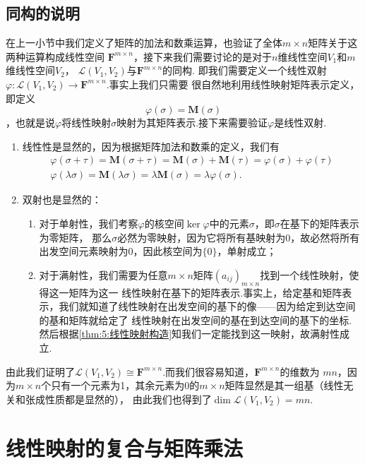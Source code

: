 \subsection{同构的说明}
在上一小节中我们定义了矩阵的加法和数乘运算，也验证了全体$m\times n$矩阵关于这两种运算构成线性空间
$\mathbf{F}^{m\times n}$，接下来我们需要讨论的是对于$n$维线性空间$V_1$和$m$维线性空间$V_2$，
$\mathcal{L}(V_1,V_2)$与$\mathbf{F}^{m\times n}$的同构.
即我们需要定义一个线性双射$\varphi:\mathcal{L}(V_1,V_2)\to\mathbf{F}^{m\times n}$.事实上我们只需要
很自然地利用线性映射矩阵表示定义，即定义
\[\varphi(\sigma)=\mathbf{M}(\sigma)\]
，也就是说$\varphi$将线性映射$\sigma$映射为其矩阵表示.接下来需要验证$\varphi$是线性双射.
\begin{enumerate}
    \item 线性性是显然的，因为根据矩阵加法和数乘的定义，我们有
    \begin{gather*}
        \varphi(\sigma+\tau)=\mathbf{M}(\sigma+\tau)=\mathbf{M}(\sigma)+\mathbf{M}(\tau)=\varphi(\sigma)+\varphi(\tau) \\
        \varphi(\lambda\sigma)=\mathbf{M}(\lambda\sigma)=\lambda\mathbf{M}(\sigma)=\lambda\varphi(\sigma).
    \end{gather*}
    \item 双射也是显然的：
    \begin{enumerate}
        \item 对于单射性，我们考察$\varphi$的核空间$\ker\varphi$中的元素$\sigma$，即$\sigma$在基下的矩阵表示为零矩阵，
        那么$\sigma$必然为零映射，因为它将所有基映射为0，故必然将所有出发空间元素映射为0，因此核空间为$\{0\}$，单射成立；
        \item 对于满射性，我们需要为任意$m\times n$矩阵$(a_{ij})_{m\times n}$找到一个线性映射，使得这一矩阵为这一
        线性映射在基下的矩阵表示.事实上，给定基和矩阵表示，我们就知道了线性映射在出发空间的基下的像——因为给定到达空间的基和矩阵就给定了
        线性映射在出发空间的基在到达空间的基下的坐标.然后根据\autoref{thm:5:线性映射构造}知我们一定能找到这一映射，故满射性成立.
    \end{enumerate}
\end{enumerate}

由此我们证明了$\mathcal{L}(V_1,V_2)\cong\mathbf{F}^{m\times n}$.而我们很容易知道，$\mathbf{F}^{m\times n}$的维数为
$mn$，因为$m\times n$个只有一个元素为1，其余元素为0的$m\times n$矩阵显然是其一组基（线性无关和张成性质都是显然的），
由此我们也得到了$\dim\mathcal{L}(V_1,V_2)=mn$.

\section{线性映射的复合与矩阵乘法}
